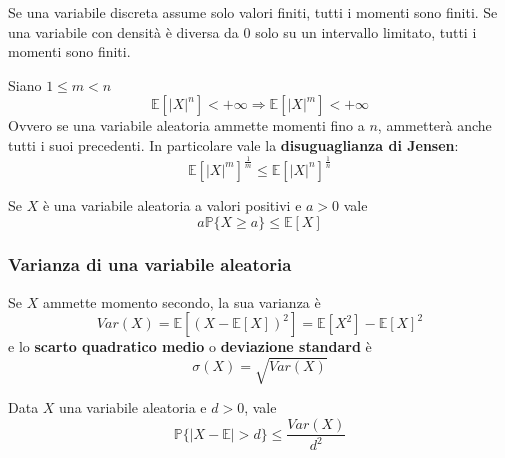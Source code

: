 \begin{observation}
	Se una variabile discreta assume solo valori finiti, tutti i momenti sono finiti. Se una variabile con densità è diversa da $0$ solo su un intervallo limitato, tutti i momenti sono finiti.
\end{observation}

\begin{proposition}
	Siano $1 \leq m < n$
	\begin{equation}
		\mathbb{E}[\lvert X \rvert ^n] < +\infty \Longrightarrow \mathbb{E}[\lvert X \rvert ^m] < +\infty
	\end{equation}
	Ovvero se una variabile aleatoria ammette momenti fino a $n$, ammetterà anche tutti i suoi precedenti. In particolare vale la \textbf{disuguaglianza di Jensen}:
	\begin{equation}
		\mathbb{E}[\lvert X \rvert^m]^{\frac{1}{m}} \leq \mathbb{E}[\lvert X \rvert^n]^{\frac{1}{n}}
	\end{equation}
\end{proposition}

\begin{proposition}
	Se $X$ è una variabile aleatoria a valori positivi e $a>0$ vale
	\begin{equation}
		a\mathbb{P}\{X \geq a\} \leq \mathbb{E}[X]
	\end{equation}
\end{proposition}

\subsubsection{Varianza di una variabile aleatoria}
\begin{definition} [Varianza]
	Se $X$ ammette momento secondo, la sua varianza è
	\begin{equation}
		Var(X) = \mathbb{E}[(X-\mathbb{E}[X])^2] = \mathbb{E}[X^2]-\mathbb{E}[X]^2
	\end{equation}
	e lo \textbf{scarto quadratico medio} o \textbf{deviazione standard} è
	\begin{equation}
		\sigma(X) = \sqrt{Var(X)}
	\end{equation}
\end{definition}

\begin{proposition}
	Data $X$ una variabile aleatoria e $d>0$, vale
	\begin{equation}
		\mathbb{P}\{\lvert X - \mathbb{E}\rvert > d\} \leq \frac{Var(X)}{d^2}
	\end{equation}
\end{proposition}

